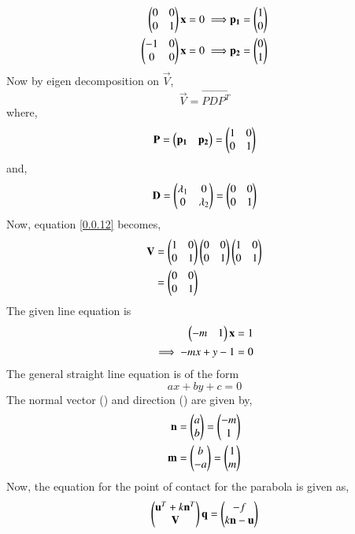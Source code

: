 \documentclass[journal,12pt,twocolumn]{IEEEtran}
\begin{document}
\begin{align}
    \begin{pmatrix}0 & 0 \\ 0 & 1\end{pmatrix}\mathbf{x} = 0 \implies& \mathbf{p_1} = \begin{pmatrix}1 \\ 0\end{pmatrix}\\
    \begin{pmatrix}-1 & 0 \\ 0 & 0\end{pmatrix}\mathbf{x} = 0 \implies& \mathbf{p_2} = \begin{pmatrix}0 \\ 1\end{pmatrix}
\end{align}
Now by eigen decomposition on $\vec{V}$,
\begin{equation}
    \vec{V} = \vec{PDP^{T}} \label{0.0.12}
\end{equation}
where,
\begin{equation}
    \mathbf{P} = \begin{pmatrix}\mathbf{p_1} & \mathbf{p_2}\end{pmatrix} = \begin{pmatrix}1 & 0\\ 0 & 1\end{pmatrix}
\end{equation}
and,
\begin{equation}
    \mathbf{D} = \begin{pmatrix}\lambda_1 & 0 \\ 0 & \lambda_2\end{pmatrix} = \begin{pmatrix}0 & 0 \\ 0 & 1\end{pmatrix}
\end{equation}
Now, equation \eqref{0.0.12} becomes,
\begin{align}
    \mathbf{V} &= \begin{pmatrix}1 & 0\\ 0 & 1\end{pmatrix}\begin{pmatrix}0 & 0 \\ 0 & 1\end{pmatrix}\begin{pmatrix}1 & 0\\ 0 & 1\end{pmatrix}\\
    &= \begin{pmatrix}0 & 0 \\ 0 & 1\end{pmatrix}
\end{align}
The given line equation is
\begin{align}
    \begin{pmatrix}-m & 1\end{pmatrix}\mathbf{x} = 1\\
    \implies -mx + y - 1 = 0 
\end{align}
The general straight line equation is of the form
\begin{equation}
    ax + by + c = 0
\end{equation}
The normal vector () and direction () are
given by,
\begin{align}
    \mathbf{n} = \begin{pmatrix}a \\ b\end{pmatrix} = \begin{pmatrix}-m \\ 1\end{pmatrix} \label{0.0.20}\\
    \mathbf{m} = \begin{pmatrix}b \\ -a\end{pmatrix} = \begin{pmatrix}1 \\ m\end{pmatrix}
\end{align}
Now, the equation for the point of contact for the parabola is given as,
\begin{equation}
    \begin{pmatrix}\mathbf{u}^{T} + k\mathbf{n}^{T}\\\mathbf{V}\end{pmatrix}\mathbf{q} = \begin{pmatrix}-f \\ k\mathbf{n}-\mathbf{u}\end{pmatrix} \label{0.0.22}
\end{equation}
\end{document}

